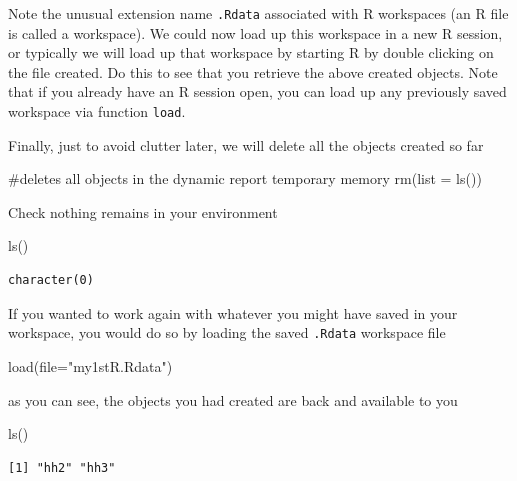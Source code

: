 \documentclass[
  letterpaper,
  DIV=11,
  numbers=noendperiod]{scrartcl}
\newenvironment{Shaded}{\begin{snugshade}}{\end{snugshade}}
\newcommand{\AttributeTok}[1]{\textcolor[rgb]{0.40,0.45,0.13}{#1}}
\newcommand{\CommentTok}[1]{\textcolor[rgb]{0.37,0.37,0.37}{#1}}
\newcommand{\FunctionTok}[1]{\textcolor[rgb]{0.28,0.35,0.67}{#1}}
\newcommand{\NormalTok}[1]{\textcolor[rgb]{0.00,0.23,0.31}{#1}}
\newcommand{\StringTok}[1]{\textcolor[rgb]{0.13,0.47,0.30}{#1}}
\begin{document}
Note the unusual extension name \texttt{.Rdata} associated with R
workspaces (an R file is called a workspace). We could now load up this
workspace in a new R session, or typically we will load up that
workspace by starting R by double clicking on the file created. Do this
to see that you retrieve the above created objects. Note that if you
already have an R session open, you can load up any previously saved
workspace via function \texttt{load}.

Finally, just to avoid clutter later, we will delete all the objects
created so far

\begin{Shaded}
\begin{Highlighting}[]
\CommentTok{\#deletes all objects in the dynamic report temporary memory}
\FunctionTok{rm}\NormalTok{(}\AttributeTok{list =} \FunctionTok{ls}\NormalTok{())}
\end{Highlighting}
\end{Shaded}

Check nothing remains in your environment

\begin{Shaded}
\begin{Highlighting}[]
\FunctionTok{ls}\NormalTok{()}
\end{Highlighting}
\end{Shaded}

\begin{verbatim}
character(0)
\end{verbatim}

If you wanted to work again with whatever you might have saved in your
workspace, you would do so by loading the saved \texttt{.Rdata}
workspace file

\begin{Shaded}
\begin{Highlighting}[]
\FunctionTok{load}\NormalTok{(}\AttributeTok{file=}\StringTok{"my1stR.Rdata"}\NormalTok{)}
\end{Highlighting}
\end{Shaded}

as you can see, the objects you had created are back and available to
you

\begin{Shaded}
\begin{Highlighting}[]
\FunctionTok{ls}\NormalTok{()}
\end{Highlighting}
\end{Shaded}

\begin{verbatim}
[1] "hh2" "hh3"
\end{verbatim}
\end{document}
